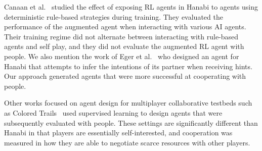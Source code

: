 \documentclass[letterpaper]{article} %
\begin{document}


Canaan et al.~ studied the effect of exposing RL agents in Hanabi  to agents using deterministic rule-based  strategies during  training.  They evaluated the performance of the augmented agent when interacting with various AI agents.   
Their training regime did not alternate between  interacting with rule-based agents and self play, and they did not evaluate the augmented RL agent with people.  
 We also mention the work of Eger et al.~ who designed an agent
 for Hanabi that attempts to infer the intentions of its partner when receiving hints. Our approach generated agents that were more successful at cooperating with people. 

Other works focused on agent design for multiplayer collaborative testbeds 
such as Colored Trails~\cite{GAL20101460}  used supervised learning to design agents  that were subsequently 
evaluated with people. These settings are significantly different than Hanabi in that players are 
essentially self-interested, and cooperation was measured in how they are able to negotiate scarce resources with other players. 
\end{document}
